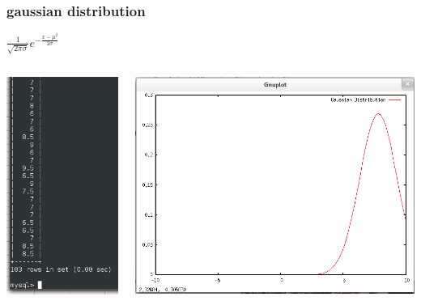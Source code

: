 \documentclass{beamer}
\begin{document}
\begin{frame}
\frametitle{gaussian distribution}
\begin{center}
$\frac{1}{\sqrt{2\pi\sigma}} e^{-\frac{{x-\mu}^2}{2\sigma}}$
\end{center}
\begin{columns}
\begin{column}{0.3\textwidth}
\includegraphics[scale=0.3]{gd1}
\end{column}
\begin{column}{0.7\textwidth}
\includegraphics[scale=0.25]{gd2}
\end{column}
\end{columns}
\end{frame}
\end{document}
